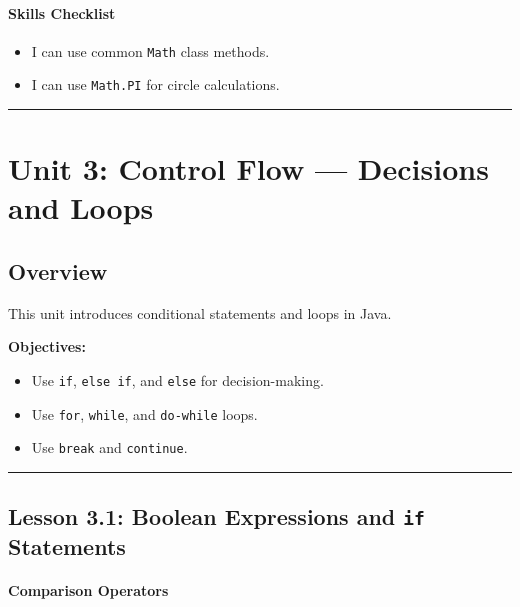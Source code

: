 \documentclass[
  justified,
  openright,
]{tufte-book}
\let\subsubsection\paragraph
\let\paragraph\paragraph
\let\subsubsection\paragraph
\let\paragraph\paragraph
\providecommand{\tightlist}{%
  \setlength{\itemsep}{0pt}\setlength{\parskip}{0pt}}
\begin{document}
\subsubsection{Skills Checklist}\label{skills-checklist-6}

\begin{itemize}
\tightlist
\item[$\square$]
  I can use common \texttt{Math} class methods.
\item[$\square$]
  I can use \texttt{Math.PI} for circle calculations.
\end{itemize}

\begin{center}\rule{0.5\linewidth}{0.5pt}\end{center}

\section{Unit 3: Control Flow --- Decisions and
Loops}\label{unit-3-control-flow-decisions-and-loops}

\subsection{Overview}\label{overview-3}

This unit introduces conditional statements and loops in Java.

\textbf{Objectives:}

\begin{itemize}
\tightlist
\item
  Use \texttt{if}, \texttt{else\ if}, and \texttt{else} for
  decision-making.
\item
  Use \texttt{for}, \texttt{while}, and \texttt{do-while} loops.
\item
  Use \texttt{break} and \texttt{continue}.
\end{itemize}

\begin{center}\rule{0.5\linewidth}{0.5pt}\end{center}

\subsection{\texorpdfstring{Lesson 3.1: Boolean Expressions and
\texttt{if}
Statements}{Lesson 3.1: Boolean Expressions and if Statements}}\label{lesson-3.1-boolean-expressions-and-if-statements}

\subsubsection{Comparison Operators}\label{comparison-operators}
\end{document}

